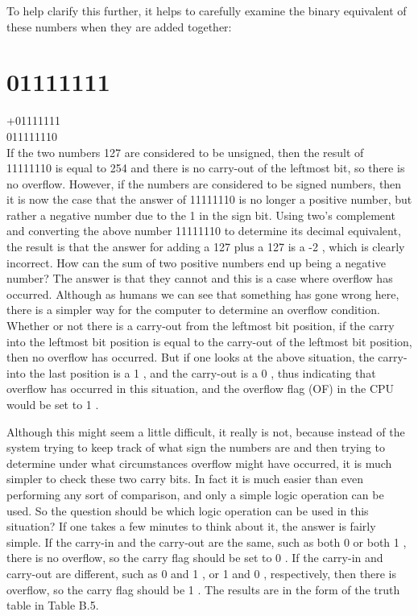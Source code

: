 \documentclass[10pt]{book}
\begin{document}
\begin{center}
\begin{center}
\begin{center}
\begin{center}
\begin{center}
To help clarify this further, it helps to carefully examine the binary equivalent of these numbers when they are added together:

\section*{01111111}
+01111111\\
011111110\\
If the two numbers 127 are considered to be unsigned, then the result of 11111110 is equal to 254 and there is no carry-out of the leftmost bit, so there is no overflow. However, if the numbers are considered to be signed numbers, then it is now the case that the answer of 11111110 is no longer a positive number, but rather a negative number due to the 1 in the sign bit. Using two's complement and converting the above number 11111110 to determine its decimal equivalent, the result is that the answer for adding a 127 plus a 127 is a -2 , which is clearly incorrect. How can the sum of two positive numbers end up being a negative number? The answer is that they cannot and this is a case where overflow has occurred. Although as humans we can see that something has gone wrong here, there is a simpler way for the computer to determine an overflow condition. Whether or not there is a carry-out from the leftmost bit position, if the carry into the leftmost bit position is equal to the carry-out of the leftmost bit position, then no overflow has occurred. But if one looks at the above situation, the carry-into the last position is a 1 , and the carry-out is a 0 , thus indicating that overflow has occurred in this situation, and the overflow flag (OF) in the CPU would be set to 1 .

Although this might seem a little difficult, it really is not, because instead of the system trying to keep track of what sign the numbers are and then trying to determine under what circumstances overflow might have occurred, it is much simpler to check these two carry bits. In fact it is much easier than even performing any sort of comparison, and only a simple logic operation can be used. So the question should be which logic operation can be used in this situation? If one takes a few minutes to think about it, the answer is fairly simple. If the carry-in and the carry-out are the same, such as both 0 or both 1 , there is no overflow, so the carry flag should be set to 0 . If the carry-in and carry-out are different, such as 0 and 1 , or 1 and 0 , respectively, then there is overflow, so the carry flag should be 1 . The results are in the form of the truth table in Table B.5.


\end{center}
\end{center}
\end{center}
\end{center}
\end{center}
\end{document}
